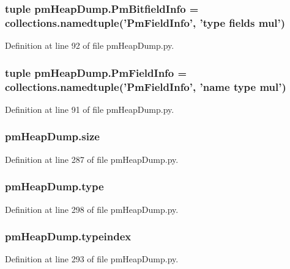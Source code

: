 \hypertarget{namespacepm_heap_dump_a8831e21f0c2e277f36a27a627e771251}{
\subsubsection[{Pm\-Bitfield\-Info}]{\setlength{\rightskip}{0pt plus 5cm}tuple pm\-Heap\-Dump.\-Pm\-Bitfield\-Info = collections.\-namedtuple('{\bf Pm\-Field\-Info}', '{\bf type} fields mul')}}\label{namespacepm_heap_dump_a8831e21f0c2e277f36a27a627e771251}


Definition at line 92 of file pm\-Heap\-Dump.\-py.

\hypertarget{namespacepm_heap_dump_ade357f2e7bd34472fdd0c07419840466}{
\subsubsection[{Pm\-Field\-Info}]{\setlength{\rightskip}{0pt plus 5cm}tuple pm\-Heap\-Dump.\-Pm\-Field\-Info = collections.\-namedtuple('Pm\-Field\-Info', 'name {\bf type} mul')}}\label{namespacepm_heap_dump_ade357f2e7bd34472fdd0c07419840466}


Definition at line 91 of file pm\-Heap\-Dump.\-py.

\hypertarget{namespacepm_heap_dump_a179cfd1626c5dad2c2485952a23c4995}{
\subsubsection[{size}]{\setlength{\rightskip}{0pt plus 5cm}pm\-Heap\-Dump.\-size}}\label{namespacepm_heap_dump_a179cfd1626c5dad2c2485952a23c4995}


Definition at line 287 of file pm\-Heap\-Dump.\-py.

\hypertarget{namespacepm_heap_dump_aeb34dbe495a159e197a5ee34718626d0}{
\subsubsection[{type}]{\setlength{\rightskip}{0pt plus 5cm}pm\-Heap\-Dump.\-type}}\label{namespacepm_heap_dump_aeb34dbe495a159e197a5ee34718626d0}


Definition at line 298 of file pm\-Heap\-Dump.\-py.

\hypertarget{namespacepm_heap_dump_ae082893f5b955b3bd5e454b551517363}{
\subsubsection[{typeindex}]{\setlength{\rightskip}{0pt plus 5cm}pm\-Heap\-Dump.\-typeindex}}\label{namespacepm_heap_dump_ae082893f5b955b3bd5e454b551517363}


Definition at line 293 of file pm\-Heap\-Dump.\-py.

